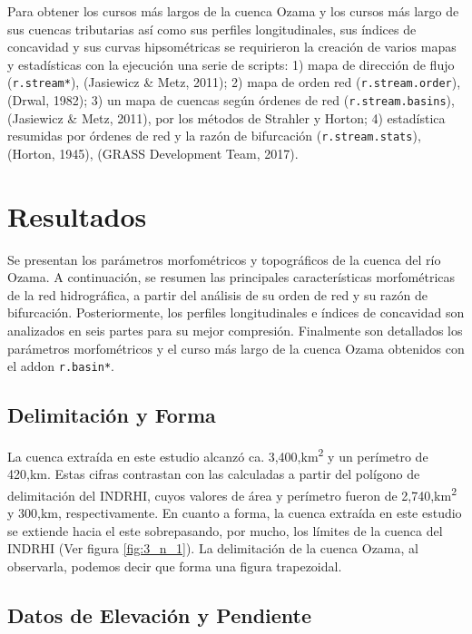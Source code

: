 \documentclass[11pt,]{article}
\begin{document}
Para obtener los cursos más largos de la cuenca Ozama y los cursos más
largo de sus cuencas tributarias así como sus perfiles longitudinales,
sus índices de concavidad y sus curvas hipsométricas se requirieron la
creación de varios mapas y estadísticas con la ejecución una serie de
scripts: 1) mapa de dirección de flujo (\texttt{r.stream*}), (Jasiewicz
\& Metz, 2011); 2) mapa de orden red (\texttt{r.stream.order}),(Drwal,
1982); 3) un mapa de cuencas según órdenes de red
(\texttt{r.stream.basins}), (Jasiewicz \& Metz, 2011), por los métodos
de Strahler y Horton; 4) estadística resumidas por órdenes de red y la
razón de bifurcación (\texttt{r.stream.stats}), (Horton, 1945), (GRASS
Development Team, 2017).

\section{Resultados}\label{resultados}

Se presentan los parámetros morfométricos y topográficos de la cuenca
del río Ozama. A continuación, se resumen las principales
características morfométricas de la red hidrográfica, a partir del
análisis de su orden de red y su razón de bifurcación. Posteriormente,
los perfiles longitudinales e índices de concavidad son analizados en
seis partes para su mejor compresión. Finalmente son detallados los
parámetros morfométricos y el curso más largo de la cuenca Ozama
obtenidos con el addon \texttt{r.basin*}.

\subsection{Delimitación y Forma}\label{delimitaciuxf3n-y-forma}

La cuenca extraída en este estudio alcanzó ca.
3,400,km\textsuperscript{2} y un perímetro de 420,km. Estas cifras
contrastan con las calculadas a partir del polígono de delimitación del
INDRHI, cuyos valores de área y perímetro fueron de
2,740,km\textsuperscript{2} y 300,km, respectivamente. En cuanto a
forma, la cuenca extraída en este estudio se extiende hacia el este
sobrepasando, por mucho, los límites de la cuenca del INDRHI (Ver figura
\ref{fig:3_n_1}). La delimitación de la cuenca Ozama, al observarla,
podemos decir que forma una figura trapezoidal.

\subsection{Datos de Elevación y
Pendiente}\label{datos-de-elevaciuxf3n-y-pendiente}
\end{document}
